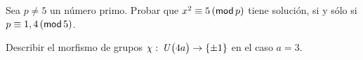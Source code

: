 % 

\begin{ejerEcuacion}
	Sea $p\neq 5$ un n\'umero primo. Probar que
	$x^2\equiv 5\tmodulo[p]$ tiene soluci\'on, si y s\'olo si
	$p\equiv 1,4\tmodulo[5]$.
\end{ejerEcuacion}

\begin{ejerEcuacion}
	Describir el morfismo de grupos
	$\chi:\,\Unidadesmod[4a]\rightarrow\{\pm1\}$ en el caso $a=3$.
\end{ejerEcuacion}

